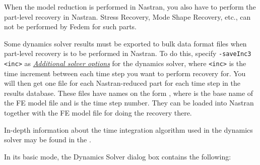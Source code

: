 When the model reduction is performed in Nastran, you also have to perform the
part-level recovery in Nastran. Stress Recovery, Mode Shape Recovery, etc.,
can not be performed by Fedem for such parts.

Some dynamics solver results must be exported to bulk data format files when
part-level recovery is to be performed in Nastran.
To do this, specify {\tt -saveInc3 \textless inc\textgreater} as
\protect\hyperlink{additional-solver-options}{\sl Additional solver options}
for the dynamics solver, where
{\tt\textless inc\textgreater} is the time increment between each time step you
want to perform recovery for. You will then get one file for each
Nastran-reduced part for each time step in the results database.
These files have names on the form
,
where  is the base name of the FE model file
and  is the time step number.
They can be loaded into Nastran together with the FE model file for doing
the recovery there.




In-depth information about the time integration algorithm used in the dynamics
solver may be found in the .



In its basic mode, the Dynamics Solver dialog box contains the following:

